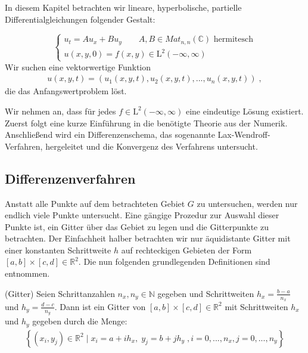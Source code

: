 In diesem Kapitel betrachten wir lineare, hyperbolische, partielle Differentialgleichungen folgender Gestalt:


\begin{equation}
    \begin{cases}
        u_t = Au_x+Bu_y \qquad A,B \in Mat_{n,n}(\mathbb{C}) \text{ hermitesch} \\
        u(x,y,0) = f(x,y) \in\operatorname{L^2}(-\infty, \infty)
    \end{cases}
\end{equation}
Wir suchen eine vektorwertige Funktion 
\begin{align}
    u(x,y,t)=(u_1(x,y,t), u_2(x,y,t), ... , u_n(x,y,t)) \; ,
\end{align}
die das Anfangswertproblem löst.

Wir nehmen an, dass für jedes $f \in \operatorname{L^2}(-\infty, \infty)$ eine eindeutige Lösung existiert. \parencite[][Kapitel 13.3]{richtmyer1994difference}
Zuerst folgt eine kurze Einführung in die benötigte Theorie aus der Numerik. Anschließend wird ein Differenzenschema, das sogenannte Lax-Wendroff-Verfahren, hergeleitet und die Konvergenz des Verfahrens untersucht.

\subsection{Differenzenverfahren}

Anstatt alle Punkte auf dem betrachteten Gebiet $G$ zu untersuchen, werden nur endlich viele Punkte untersucht. Eine gängige Prozedur zur Auswahl dieser Punkte ist, ein Gitter über das Gebiet zu legen und die Gitterpunkte zu betrachten. Der Einfachheit halber betrachten wir nur äquidistante Gitter mit einer konstanten Schrittweite $h$ auf rechteckigen Gebieten der Form $[a,b] \times [c,d] \in \mathbb{R}^2$. Die nun folgenden grundlegenden Definitionen sind \parencite[][Kapitel 5]{bollhofer2013numerische} entnommen.

\begin{definition}(Gitter)
    Seien Schrittanzahlen $n_x, n_y \in \mathbb{N}$ gegeben und Schrittweiten $h_x = \frac{b-a}{n_x}$ und $h_y = \frac{d-c}{n_y}$. Dann ist ein Gitter von $[a,b] \times [c,d] \in \mathbb{R}^2$ mit Schrittweiten $h_x$ und $h_y$ gegeben durch die Menge:
    \begin{align}
        \left\{ (x_i, y_j) \in \mathbb{R}^2 \; | \; x_i=a+ih_x, \; y_j=b+jh_y \; ,  i=0, ..., n_x , j=0,..., n_y \right\}
    \end{align}

\end{definition}


